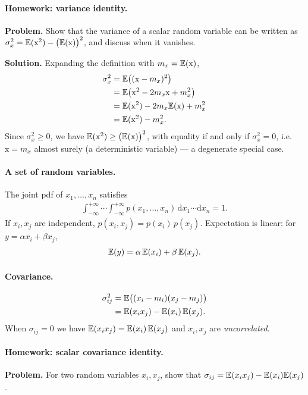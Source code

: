 \paragraph{Homework: variance identity.}
\textbf{Problem.} Show that the variance of a scalar random variable can be written as $\sigma_x^2 = \mathbb{E}(\mathrm{x}^2) - \big(\mathbb{E}(\mathrm{x})\big)^2$, and discuss when it vanishes.

\textbf{Solution.} Expanding the definition with $m_x = \mathbb{E}(\mathrm{x})$,
\begin{align}
\sigma_x^2 &= \mathbb{E}\big((\mathrm{x}-m_x)^2\big) \\
&= \mathbb{E}\big(\mathrm{x}^2 - 2 m_x \mathrm{x} + m_x^2\big) \\
&= \mathbb{E}(\mathrm{x}^2) - 2 m_x \mathbb{E}(\mathrm{x}) + m_x^2 \\
&= \mathbb{E}(\mathrm{x}^2) - m_x^2.
\end{align}
Since $\sigma_x^2\ge 0$, we have $\mathbb{E}(\mathrm{x}^2)\ge \big(\mathbb{E}(\mathrm{x})\big)^2$, with equality if and only if $\sigma_x^2=0$, i.e. $\mathrm{x}=m_x$ almost surely (a deterministic variable) --- a degenerate special case.

\paragraph{A set of random variables.}
The joint pdf of $x_1,\dots,x_n$ satisfies
\begin{align}
\int_{-\infty}^{+\infty}\!\!\!\cdots\!\int_{-\infty}^{+\infty} p(x_1,\dots,x_n)\,\mathrm{d}x_1\cdots\mathrm{d}x_n = 1.
\end{align}
If $x_i,x_j$ are independent, $p(x_i,x_j) = p(x_i)\,p(x_j)$. Expectation is linear: for $y = \alpha x_i + \beta x_j$,
\begin{align}
\mathbb{E}(y) = \alpha\,\mathbb{E}(x_i) + \beta\,\mathbb{E}(x_j).
\end{align}

\paragraph{Covariance.}
\begin{align}
\sigma_{ij}^2 &= \mathbb{E}\big((x_i-m_i)(x_j-m_j)\big) \\
&= \mathbb{E}(x_i x_j) - \mathbb{E}(x_i)\,\mathbb{E}(x_j).
\end{align}
When $\sigma_{ij}=0$ we have $\mathbb{E}(x_i x_j) = \mathbb{E}(x_i)\,\mathbb{E}(x_j)$ and $x_i,x_j$ are \emph{uncorrelated}.

\paragraph{Homework: scalar covariance identity.}
\textbf{Problem.} For two random variables $x_i,x_j$, show that $\sigma_{ij} = \mathbb{E}(x_i x_j) - \mathbb{E}(x_i)\mathbb{E}(x_j)$.

